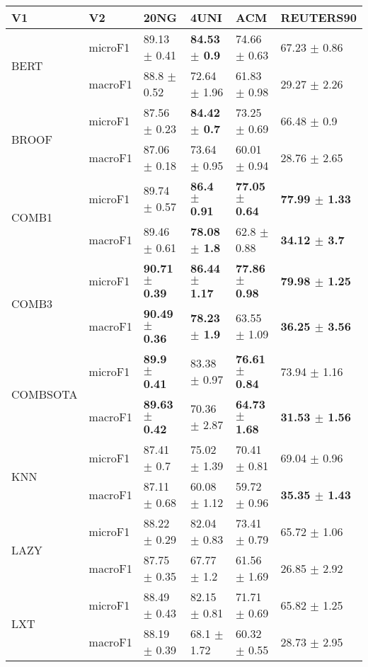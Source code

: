 \documentclass[]{article}
\begin{document}
\begin{table}[ht]
\centering
\begin{tabular}{llllll}
  \hline
V1 & V2 & 20NG & 4UNI & ACM & REUTERS90 \\ 
  \hline
\multirow{2}{*}{BERT} & microF1 & 89.13 $\pm$  0.41 & \bf{84.53 $\pm$  0.9} & 74.66 $\pm$  0.63 & 67.23 $\pm$  0.86 \\ 
   & macroF1 & 88.8 $\pm$  0.52 & 72.64 $\pm$  1.96 & 61.83 $\pm$  0.98 & 29.27 $\pm$  2.26 \\ 
  \multirow{2}{*}{BROOF} & microF1 & 87.56 $\pm$  0.23 & \bf{84.42 $\pm$  0.7} & 73.25 $\pm$  0.69 & 66.48 $\pm$  0.9 \\ 
   & macroF1 & 87.06 $\pm$  0.18 & 73.64 $\pm$  0.95 & 60.01 $\pm$  0.94 & 28.76 $\pm$  2.65 \\ 
  \multirow{2}{*}{COMB1} & microF1 & 89.74 $\pm$  0.57 & \bf{86.4 $\pm$  0.91} & \bf{77.05 $\pm$  0.64} & \bf{77.99 $\pm$  1.33} \\ 
   & macroF1 & 89.46 $\pm$  0.61 & \bf{78.08 $\pm$  1.8} & 62.8 $\pm$  0.88 & \bf{34.12 $\pm$  3.7} \\ 
  \multirow{2}{*}{COMB3} & microF1 & \bf{90.71 $\pm$  0.39} & \bf{86.44 $\pm$  1.17} & \bf{77.86 $\pm$  0.98} & \bf{79.98 $\pm$  1.25} \\ 
   & macroF1 & \bf{90.49 $\pm$  0.36} & \bf{78.23 $\pm$  1.9} & 63.55 $\pm$  1.09 & \bf{36.25 $\pm$  3.56} \\ 
  \multirow{2}{*}{COMBSOTA} & microF1 & \bf{89.9 $\pm$  0.41} & 83.38 $\pm$  0.97 & \bf{76.61 $\pm$  0.84} & 73.94 $\pm$  1.16 \\ 
   & macroF1 & \bf{89.63 $\pm$  0.42} & 70.36 $\pm$  2.87 & \bf{64.73 $\pm$  1.68} & \bf{31.53 $\pm$  1.56} \\ 
  \multirow{2}{*}{KNN} & microF1 & 87.41 $\pm$  0.7 & 75.02 $\pm$  1.39 & 70.41 $\pm$  0.81 & 69.04 $\pm$  0.96 \\ 
   & macroF1 & 87.11 $\pm$  0.68 & 60.08 $\pm$  1.12 & 59.72 $\pm$  0.96 & \bf{35.35 $\pm$  1.43} \\ 
  \multirow{2}{*}{LAZY} & microF1 & 88.22 $\pm$  0.29 & 82.04 $\pm$  0.83 & 73.41 $\pm$  0.79 & 65.72 $\pm$  1.06 \\ 
   & macroF1 & 87.75 $\pm$  0.35 & 67.77 $\pm$  1.2 & 61.56 $\pm$  1.69 & 26.85 $\pm$  2.92 \\ 
  \multirow{2}{*}{LXT} & microF1 & 88.49 $\pm$  0.43 & 82.15 $\pm$  0.81 & 71.71 $\pm$  0.69 & 65.82 $\pm$  1.25 \\ 
   & macroF1 & 88.19 $\pm$  0.39 & 68.1 $\pm$  1.72 & 60.32 $\pm$  0.55 & 28.73 $\pm$  2.95 \\ 

\end{tabular}
\end{table}
\end{document}
